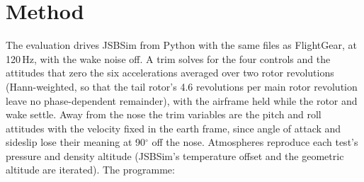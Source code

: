 \documentclass[10pt,a4paper,twocolumn]{article}
\newcommand{\Tab}[1]{}
\begin{document}
\begin{table}[t]
\centering\small
\caption{Principal data.}\label{tab:params}
\Tab{params}
\end{table}

\section{Method}\label{sec:method}
The evaluation drives JSBSim from Python with the same files as FlightGear, at 120\,Hz, with the wake noise off. A trim solves for
the four controls and the attitudes that zero the six accelerations averaged over two rotor revolutions (Hann-weighted, so that the
tail rotor's 4.6 revolutions per main rotor revolution leave no phase-dependent remainder), with the airframe held while the rotor and
wake settle. Away from the nose the trim variables are the pitch and roll attitudes with the velocity fixed in the earth frame, since
angle of attack and sideslip lose their meaning at 90$^\circ$ off the nose. Atmospheres reproduce each test's pressure and density altitude (JSBSim's temperature
offset and the geometric altitude are iterated). The programme:
\end{document}
